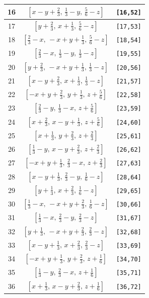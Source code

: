 \documentclass[fleqn,8pt]{jsarticle}
\begin{document}
\begin{longtable}{ccc}
16 & $\left[ x - y + \frac{2}{3},\, \frac{1}{3} - y,\, \frac{5}{6} - z \right]$ & {\tt [16,52]} \\ \hline
17 & $\left[ y + \frac{2}{3},\, x + \frac{1}{3},\, \frac{5}{6} - z \right]$ & {\tt [17,53]} \\ \hline
18 & $\left[ \frac{2}{3} - x,\, - x + y + \frac{1}{3},\, \frac{5}{6} - z \right]$ & {\tt [18,54]} \\ \hline
19 & $\left[ \frac{2}{3} - x,\, \frac{1}{3} - y,\, \frac{1}{3} - z \right]$ & {\tt [19,55]} \\ \hline
20 & $\left[ y + \frac{2}{3},\, - x + y + \frac{1}{3},\, \frac{1}{3} - z \right]$ & {\tt [20,56]} \\ \hline
21 & $\left[ x - y + \frac{2}{3},\, x + \frac{1}{3},\, \frac{1}{3} - z \right]$ & {\tt [21,57]} \\ \hline
22 & $\left[ - x + y + \frac{2}{3},\, y + \frac{1}{3},\, z + \frac{5}{6} \right]$ & {\tt [22,58]} \\ \hline
23 & $\left[ \frac{2}{3} - y,\, \frac{1}{3} - x,\, z + \frac{5}{6} \right]$ & {\tt [23,59]} \\ \hline
24 & $\left[ x + \frac{2}{3},\, x - y + \frac{1}{3},\, z + \frac{5}{6} \right]$ & {\tt [24,60]} \\ \hline
25 & $\left[ x + \frac{1}{3},\, y + \frac{2}{3},\, z + \frac{2}{3} \right]$ & {\tt [25,61]} \\ \hline
26 & $\left[ \frac{1}{3} - y,\, x - y + \frac{2}{3},\, z + \frac{2}{3} \right]$ & {\tt [26,62]} \\ \hline
27 & $\left[ - x + y + \frac{1}{3},\, \frac{2}{3} - x,\, z + \frac{2}{3} \right]$ & {\tt [27,63]} \\ \hline
28 & $\left[ x - y + \frac{1}{3},\, \frac{2}{3} - y,\, \frac{1}{6} - z \right]$ & {\tt [28,64]} \\ \hline
29 & $\left[ y + \frac{1}{3},\, x + \frac{2}{3},\, \frac{1}{6} - z \right]$ & {\tt [29,65]} \\ \hline
30 & $\left[ \frac{1}{3} - x,\, - x + y + \frac{2}{3},\, \frac{1}{6} - z \right]$ & {\tt [30,66]} \\ \hline
31 & $\left[ \frac{1}{3} - x,\, \frac{2}{3} - y,\, \frac{2}{3} - z \right]$ & {\tt [31,67]} \\ \hline
32 & $\left[ y + \frac{1}{3},\, - x + y + \frac{2}{3},\, \frac{2}{3} - z \right]$ & {\tt [32,68]} \\ \hline
33 & $\left[ x - y + \frac{1}{3},\, x + \frac{2}{3},\, \frac{2}{3} - z \right]$ & {\tt [33,69]} \\ \hline
34 & $\left[ - x + y + \frac{1}{3},\, y + \frac{2}{3},\, z + \frac{1}{6} \right]$ & {\tt [34,70]} \\ \hline
35 & $\left[ \frac{1}{3} - y,\, \frac{2}{3} - x,\, z + \frac{1}{6} \right]$ & {\tt [35,71]} \\ \hline
36 & $\left[ x + \frac{1}{3},\, x - y + \frac{2}{3},\, z + \frac{1}{6} \right]$ & {\tt [36,72]} \\
\end{longtable}
\end{document}
